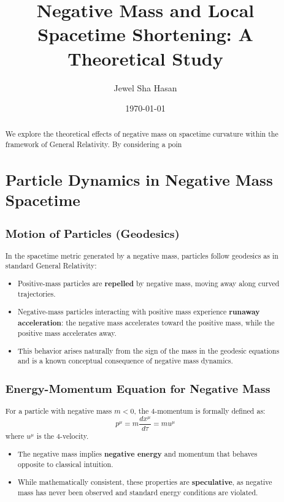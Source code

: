 \documentclass[12pt]{article}
\title{Negative Mass and Local Spacetime Shortening: A Theoretical Study}
\author{Jewel Sha Hasan}
\date{\today}
\begin{document}
\maketitle

\begin{abstract}
We explore the theoretical effects of negative mass on spacetime curvature within the framework of General Relativity. By considering a poin\section{Particle Dynamics in Negative Mass Spacetime}

\subsection{Motion of Particles (Geodesics)}
In the spacetime metric generated by a negative mass, particles follow geodesics as in standard General Relativity:
\begin{itemize}
    \item Positive-mass particles are \textbf{repelled} by negative mass, moving away along curved trajectories.
    \item Negative-mass particles interacting with positive mass experience \textbf{runaway acceleration}: the negative mass accelerates toward the positive mass, while the positive mass accelerates away.
    \item This behavior arises naturally from the sign of the mass in the geodesic equations and is a known conceptual consequence of negative mass dynamics.
\end{itemize}

\subsection{Energy-Momentum Equation for Negative Mass}
For a particle with negative mass $m < 0$, the 4-momentum is formally defined as:
\begin{equation}
p^\mu = m \frac{dx^\mu}{d\tau} = m u^\mu
\end{equation}
where $u^\mu$ is the 4-velocity. 
\begin{itemize}
    \item The negative mass implies \textbf{negative energy} and momentum that behaves opposite to classical intuition.
    \item While mathematically consistent, these properties are \textbf{speculative}, as negative mass has never been observed and standard energy conditions are violated.
\end{itemize}


\end{abstract}
\end{document}

